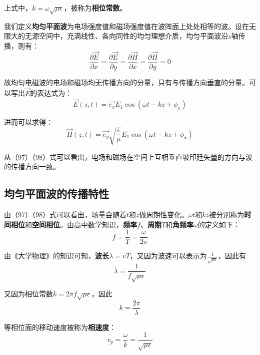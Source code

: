 \documentclass[UTF8,a4paper,11pt]{article}
\begin{document}
上式中，$k=\omega\sqrt{\mu\epsilon}$，被称为\textbf{相位常数}。

我们定义\textbf{均匀平面波}为电场强度值和磁场强度值在波阵面上处处相等的波。设在无限大的无源空间中，充满线性、各向同性的均匀理想介质，均匀平面波沿$z$轴传播，则有：
\begin{equation}
\frac{\partial\overrightarrow{E}}{\partial x}=\frac{\partial\overrightarrow{E}}{\partial y}=\frac{\partial\overrightarrow{H}}{\partial x}=\frac{\partial\overrightarrow{H}}{\partial y}=0
\end{equation}

故均匀电磁波的电场和磁场均无传播方向的分量，只有与传播方向垂直的分量。可以写出$\overrightarrow{E}$的表达式为：
\begin{equation}
\overrightarrow{E}(z,t)=\overrightarrow{e_x}E_1\cos(\omega t-kz+\phi_x)
\end{equation}

进而可以求得：
\begin{equation}
\overrightarrow{H}(z,t)=\overrightarrow{e_y}\sqrt{\frac{\epsilon}{\mu}}E_1\cos(\omega t-kz+\phi_x)
\end{equation}

从（97）（98）式可以看出，电场和磁场在空间上互相垂直坡印廷矢量的方向与波的传播方向一致。

\subsection{均匀平面波的传播特性}

由（97）（98）式可以看出，场量会随着$t$和$z$做周期性变化。$\omega t$和$kz$被分别称为\textbf{时间相位}和\textbf{空间相位}。由高中数学知识，\textbf{频率}$f$、\textbf{周期}$T$和\textbf{角频率}$\omega$的定义如下：
\begin{equation}
f=\frac{1}{T}=\frac{\omega}{2\pi}
\end{equation}

由《大学物理》的知识可知，\textbf{波长}$\lambda=vT$，又因为波速可以表示为$\frac{1}{\sqrt{\mu\epsilon}}$，因此有
\begin{equation}
\lambda=\frac{1}{f\sqrt{\mu\epsilon}}
\end{equation}

又因为相位常数$k=2\pi f\sqrt{\mu\epsilon}$，因此
\begin{equation}
k=\frac{2\pi}{\lambda}
\end{equation}

等相位面的移动速度被称为\textbf{相速度}：
\begin{equation}
v_p=\frac{\omega}{k}=\frac{1}{\sqrt{\mu\epsilon}}
\end{equation}
\end{document}
